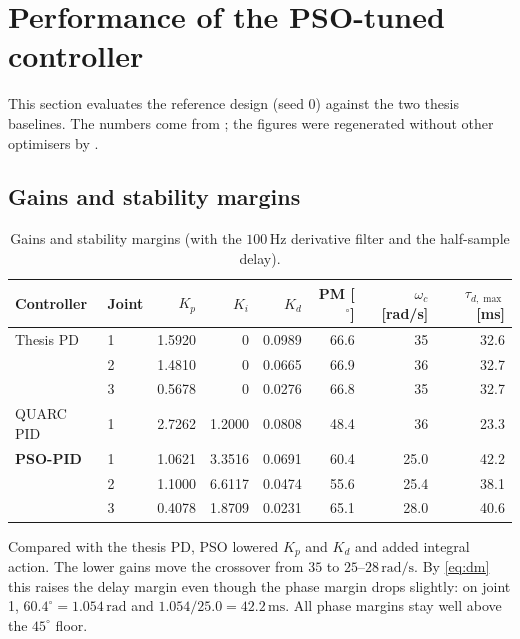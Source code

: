 \documentclass[11pt,a4paper]{article}
\begin{document}
\section{Performance of the PSO-tuned controller}
\label{sec:results}

This section evaluates the reference design (seed 0) against the two thesis baselines. The numbers come
from ; the figures were regenerated without other optimisers by
.

\subsection{Gains and stability margins}

\begin{table}[H]
\centering
\begin{tabular}{llrrrrrr}
\toprule
Controller & Joint & $K_p$ & $K_i$ & $K_d$ & PM [$^\circ$] & $\omega_c$ [rad/s] & $\tau_{d,\max}$ [ms]\\
\midrule
Thesis PD & 1 & 1.5920 & 0 & 0.0989 & 66.6 & 35 & 32.6\\
          & 2 & 1.4810 & 0 & 0.0665 & 66.9 & 36 & 32.7\\
          & 3 & 0.5678 & 0 & 0.0276 & 66.8 & 35 & 32.7\\
\midrule
QUARC PID & 1 & 2.7262 & 1.2000 & 0.0808 & 48.4 & 36 & 23.3\\
\midrule
\textbf{PSO-PID} & 1 & 1.0621 & 3.3516 & 0.0691 & 60.4 & 25.0 & 42.2\\
                 & 2 & 1.1000 & 6.6117 & 0.0474 & 55.6 & 25.4 & 38.1\\
                 & 3 & 0.4078 & 1.8709 & 0.0231 & 65.1 & 28.0 & 40.6\\
\bottomrule
\end{tabular}
\caption{Gains and stability margins (with the $100\,\mathrm{Hz}$ derivative filter and the half-sample
delay).}
\label{tab:gains}
\end{table}

Compared with the thesis PD, PSO lowered $K_p$ and $K_d$ and added integral action. The lower gains move the
crossover from $35$ to $25$--$28\,\mathrm{rad/s}$. By \eqref{eq:dm} this raises the delay margin even though
the phase margin drops slightly: on joint 1, $60.4^\circ = 1.054\,\mathrm{rad}$ and
$1.054/25.0 = 42.2\,\mathrm{ms}$. All phase margins stay well above the $45^\circ$ floor.
\end{document}
